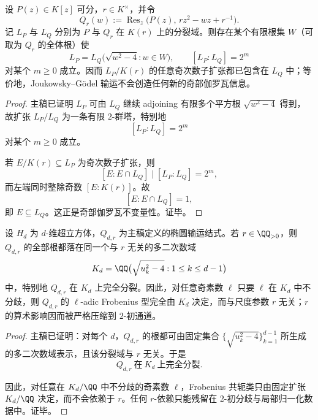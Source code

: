 \begin{theorem}\label{thm:conclusion-jg-transport-oddpart-galois-invariance}
设 \(P(z)\in K[z]\) 可分，\(r\in K^\times\)，并令
\[
Q_r(w):=\operatorname{Res}_z\bigl(P(z),\,rz^2-wz+r^{-1}\bigr).
\]
记 \(L_P\) 与 \(L_Q\) 分别为 \(P\) 与 \(Q_r\) 在 \(K(r)\) 上的分裂域。则存在某个有限根集 \(W\)（可取为 \(Q_r\) 的全体根）使
\[
L_P=L_Q\bigl(\sqrt{w^2-4}:w\in W\bigr),
\qquad
[L_P:L_Q]=2^m
\]
对某个 \(m\ge 0\) 成立。因而 \(L_P/K(r)\) 的任意奇次数子扩张都已包含在 \(L_Q\) 中；等价地，Joukowsky--Gödel 输运不会创造任何新的奇部伽罗瓦信息。
\end{theorem}
\begin{proof}
主稿已证明 \(L_P\) 可由 \(L_Q\) 继续 adjoining 有限多个平方根 \(\sqrt{w^2-4}\) 得到，故扩张 \(L_P/L_Q\) 为一条有限 \(2\)-群塔，特别地
\[
[L_P:L_Q]=2^m
\]
对某个 \(m\ge 0\) 成立。

若 \(E/K(r)\subseteq L_P\) 为奇次数子扩张，则
\[
[E:E\cap L_Q]\mid [L_P:L_Q]=2^m,
\]
而左端同时整除奇数 \([E:K(r)]\)。故
\[
[E:E\cap L_Q]=1,
\]
即 \(E\subseteq L_Q\)。这正是奇部伽罗瓦不变量性。证毕。
\end{proof}

\begin{theorem}\label{thm:conclusion-hypercube-leyang-lift-oddprime-rigidity}
设 \(H_d\) 为 \(d\)-维超立方体，\(Q_{d,r}\) 为主稿定义的椭圆输运结式。若 \(r\in\QQ_{>0}\)，则 \(Q_{d,r}\) 的全部根都落在同一个与 \(r\) 无关的多二次数域
\[
K_d=\QQ\bigl(\sqrt{u_k^2-4}:1\le k\le d-1\bigr)
\]
中，特别地 \(Q_{d,r}\) 在 \(K_d\) 上完全分裂。因此，对任意奇素数 \(\ell\) 只要 \(\ell\) 在 \(K_d\) 中不分歧，则 \(Q_{d,r}\) 的 \(\ell\)-adic Frobenius 型完全由 \(K_d\) 决定，而与尺度参数 \(r\) 无关；\(r\) 的算术影响因而被严格压缩到 \(2\)-初通道。
\end{theorem}
\begin{proof}
主稿已证明：对每个 \(d\)，\(Q_{d,r}\) 的根都可由固定集合 \(\{\sqrt{u_k^2-4}\}_{k=1}^{d-1}\) 所生成的多二次数域表示，且该分裂域与 \(r\) 无关。于是
\[
Q_{d,r}\ \text{在}\ K_d\ \text{上完全分裂}.
\]

因此，对任意在 \(K_d/\QQ\) 中不分歧的奇素数 \(\ell\)，Frobenius 共轭类只由固定扩张 \(K_d/\QQ\) 决定，而不会依赖于 \(r\)。任何 \(r\)-依赖只能残留在 \(2\)-初分歧与局部归一化数据中。证毕。
\end{proof}

